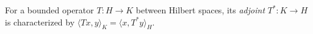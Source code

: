 
For a bounded operator $T:H\to K$ between Hilbert spaces, its \emph{adjoint} $T^*:K\to H$ is characterized by $\langle Tx,y\rangle_K=\langle x,T^*y\rangle_H$.
